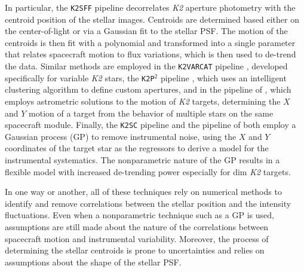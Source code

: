 \documentclass[]{emulateapj}
\begin{document}
In particular, the \texttt{K2SFF} pipeline \citep{VJ14} decorrelates \emph{K2} aperture 
photometry with the centroid position
of the stellar images. Centroids are determined based either on the center-of-light
or via a Gaussian fit to the stellar PSF. The motion of the centroids is then fit with a polynomial
and transformed into a single parameter that relates spacecraft motion to flux variations,
which is then used to de-trend the data. Similar methods are employed in the \texttt{K2VARCAT} pipeline \citep{ARM15}, 
developed specifically for variable \emph{K2} stars, the \texttt{K2P$^2$} pipeline \citep{LUN15},
which uses an intelligent clustering algorithm to define custom apertures, and in the pipeline
of \cite{HUA15}, which employs astrometric solutions to the motion of \emph{K2} targets,
determining the $X$ and $Y$ motion of a target from the behavior of multiple stars on
the same spacecraft module. Finally, the \texttt{K2SC} pipeline \citep{AIG15,AIG16} and 
the pipeline of \cite{CRO15} both employ a Gaussian process (GP) to remove
instrumental noise, using the $X$ and $Y$ coordinates of the target star as the regressors to derive
a model for the instrumental systematics. The nonparametric nature of the GP results 
in a flexible model with increased de-trending power especially for dim \emph{K2}
targets.

In one way or another, all of these techniques rely on numerical methods to identify and 
remove correlations between the stellar position and the intensity fluctuations. Even
when a nonparametric technique such as a GP is used, assumptions are still made about
the nature of the correlations between spacecraft motion and instrumental variability.
Moreover, the process of determining the stellar centroids is prone to uncertainties
and relies on assumptions about the shape of the stellar PSF.
\end{document}
